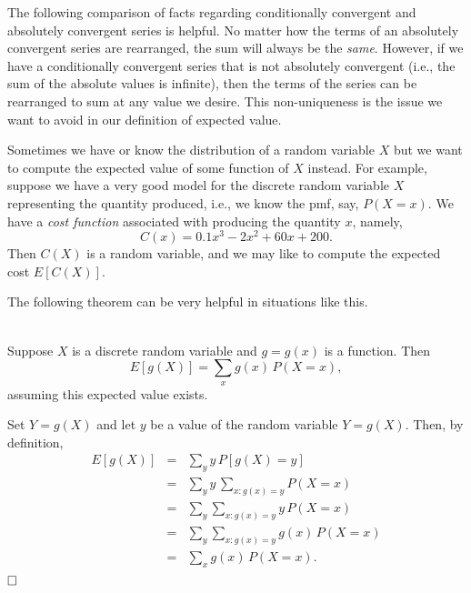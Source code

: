 \documentclass[12pt]{article}
\begin{document}
\noindent The following comparison of facts regarding conditionally convergent and absolutely convergent series is helpful.
No matter how the terms of an absolutely convergent series are rearranged, the sum will always be the {\em same}. However, if we have a conditionally convergent series that is not absolutely convergent (i.e., the sum of the absolute values is infinite), then the terms of the series can be rearranged to sum at any value we desire. This non-uniqueness is the issue we want to avoid in our definition of expected value.


\newpage


\noindent Sometimes we have or know the distribution of a random variable $X$ but we want to compute the expected value of some function of $X$ instead. For example, suppose we have a very good model for the discrete random variable $X$ representing the quantity produced, i.e.,
we know the pmf, say, $P(X=x)$.  We have a {\em cost function} associated with producing the quantity $x$, namely,
$$C(x) = 0.1x^3 -2x^2 + 60x + 200.$$
Then $C(X)$ is a random variable, and we may like to compute the expected cost $E[C(X)]$.\\

\bigskip

\noindent The following
theorem can be very helpful in situations like this.  \\


\bigskip

\label{lotus}\\
Suppose $X$ is a discrete random variable and $g=g(x)$ is a function. Then
$$E[g(X)] = \sum_x g(x)\,P(X=x),$$
assuming this expected value exists.\\


\bigskip

  Set $Y=g(X)$ and let $y$ be a value of the random variable $Y=g(X)$. Then, by definition,
\begin{eqnarray*}
E[g(X)]
& = & \sum_y y\,P[g(X)=y]\\
& = & \sum_y y\,\sum_{x:g(x)=y}P(X=x)\\
& = & \sum_y \sum_{x:g(x)=y}y\,P(X=x)\\
& = & \sum_y \sum_{x:g(x)=y}g(x)\,P(X=x)\\
& = & \sum_x g(x)\,P(X=x).\\
\end{eqnarray*}$\hfill \Box$
\end{document}
